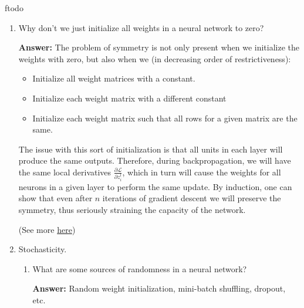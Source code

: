 ƒtodo\documentclass{article}
\newenvironment{QandA}{\begin{enumerate}[label=\arabic*.]}{\end{enumerate}}
\newenvironment{InnerQandA}{\begin{enumerate}[label=\roman*.]}{\end{enumerate}}
\newenvironment{answer}{\par\normalfont \textbf{Answer:}}{}
\begin{document}
\begin{QandA}
    \item Why don’t we just initialize all weights in a neural network to zero?
    \begin{answer}
        The problem of symmetry is not only present when we initialize the weights with zero, but also when we (in decreasing order of restrictiveness):
        \begin{itemize}
            \item Initialize all weight matrices with a constant.
            \item Initialize each weight matrix with a different constant
            \item Initialize each weight matrix such that all rows for a given matrix are the same. 
        \end{itemize}
        The issue with this sort of initialization is that all units in each layer will produce the same outputs. Therefore, during backpropagation, we will have the same local derivatives $\frac{\partial \mathcal{L}}{\partial z^{l}_i}$, which in turn will cause the weights for all neurons in a given layer to perform the same update. By induction, one can show that even after $n$ iterations of gradient descent we will preserve the symmetry, thus seriously straining the capacity of the network. 

        (See more \href{https://www.coursera.org/lecture/neural-networks-deep-learning/www.deeplearning.ai-XtFPI}{here})
    \end{answer}

    \item Stochasticity.
    \begin{InnerQandA}
        \item What are some sources of randomness in a neural network?
        \begin{answer}
            Random weight initialization, mini-batch shuffling, dropout, etc.
        \end{answer}


\end{InnerQandA}
\end{QandA}
\end{document}

